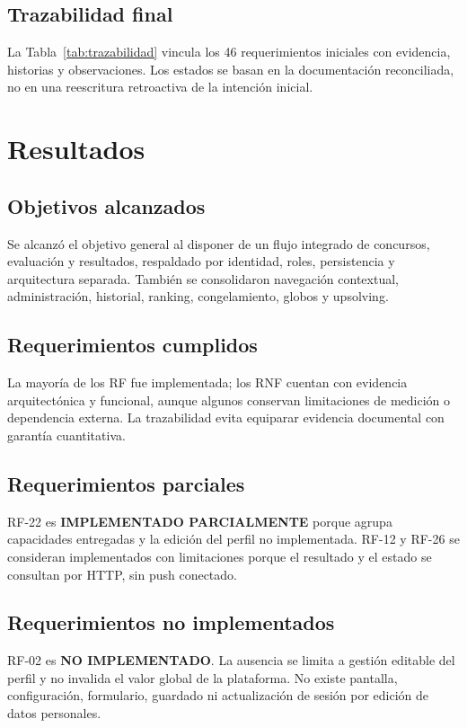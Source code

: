 \documentclass[11pt,a4paper]{article}
\newcommand{\statuspartial}{\textbf{IMPLEMENTADO PARCIALMENTE}\xspace}
\newcommand{\statusno}{\textbf{NO IMPLEMENTADO}\xspace}
\begin{document}
\subsection{Trazabilidad final}
La Tabla~\ref{tab:trazabilidad} vincula los 46 requerimientos iniciales con evidencia, historias y observaciones. Los estados se basan en la documentación reconciliada, no en una reescritura retroactiva de la intención inicial.

\section{Resultados}
\label{sec:resultados}

\subsection{Objetivos alcanzados}
Se alcanzó el objetivo general al disponer de un flujo integrado de concursos, evaluación y resultados, respaldado por identidad, roles, persistencia y arquitectura separada. También se consolidaron navegación contextual, administración, historial, ranking, congelamiento, globos y upsolving.

\subsection{Requerimientos cumplidos}
La mayoría de los RF fue implementada; los RNF cuentan con evidencia arquitectónica y funcional, aunque algunos conservan limitaciones de medición o dependencia externa. La trazabilidad evita equiparar evidencia documental con garantía cuantitativa.

\subsection{Requerimientos parciales}
RF-22 es \statuspartial porque agrupa capacidades entregadas y la edición del perfil no implementada. RF-12 y RF-26 se consideran implementados con limitaciones porque el resultado y el estado se consultan por HTTP, sin push conectado.

\subsection{Requerimientos no implementados}
RF-02 es \statusno. La ausencia se limita a gestión editable del perfil y no invalida el valor global de la plataforma. No existe pantalla, configuración, formulario, guardado ni actualización de sesión por edición de datos personales.
\end{document}
